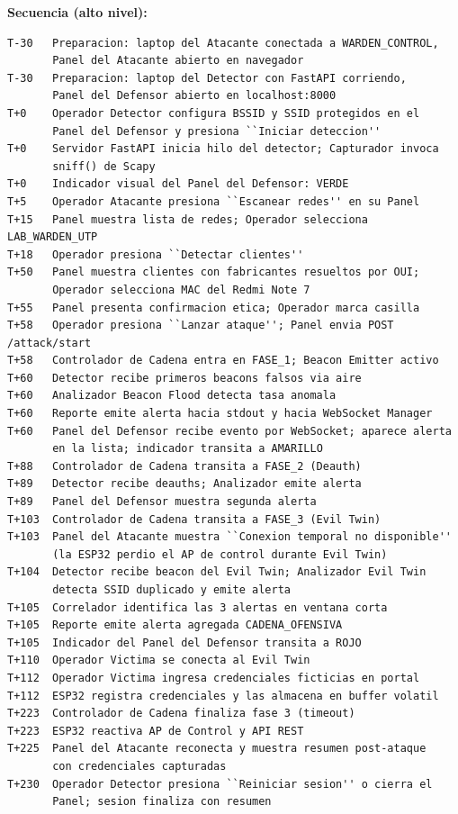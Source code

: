 \documentclass[11pt,a4paper]{article}
\begin{document}
\textbf{Secuencia (alto nivel):}

\vspace{0.3cm}
\begin{verbatim}
T-30   Preparacion: laptop del Atacante conectada a WARDEN_CONTROL,
       Panel del Atacante abierto en navegador
T-30   Preparacion: laptop del Detector con FastAPI corriendo,
       Panel del Defensor abierto en localhost:8000
T+0    Operador Detector configura BSSID y SSID protegidos en el
       Panel del Defensor y presiona ``Iniciar deteccion''
T+0    Servidor FastAPI inicia hilo del detector; Capturador invoca
       sniff() de Scapy
T+0    Indicador visual del Panel del Defensor: VERDE
T+5    Operador Atacante presiona ``Escanear redes'' en su Panel
T+15   Panel muestra lista de redes; Operador selecciona LAB_WARDEN_UTP
T+18   Operador presiona ``Detectar clientes''
T+50   Panel muestra clientes con fabricantes resueltos por OUI;
       Operador selecciona MAC del Redmi Note 7
T+55   Panel presenta confirmacion etica; Operador marca casilla
T+58   Operador presiona ``Lanzar ataque''; Panel envia POST /attack/start
T+58   Controlador de Cadena entra en FASE_1; Beacon Emitter activo
T+60   Detector recibe primeros beacons falsos via aire
T+60   Analizador Beacon Flood detecta tasa anomala
T+60   Reporte emite alerta hacia stdout y hacia WebSocket Manager
T+60   Panel del Defensor recibe evento por WebSocket; aparece alerta
       en la lista; indicador transita a AMARILLO
T+88   Controlador de Cadena transita a FASE_2 (Deauth)
T+89   Detector recibe deauths; Analizador emite alerta
T+89   Panel del Defensor muestra segunda alerta
T+103  Controlador de Cadena transita a FASE_3 (Evil Twin)
T+103  Panel del Atacante muestra ``Conexion temporal no disponible''
       (la ESP32 perdio el AP de control durante Evil Twin)
T+104  Detector recibe beacon del Evil Twin; Analizador Evil Twin
       detecta SSID duplicado y emite alerta
T+105  Correlador identifica las 3 alertas en ventana corta
T+105  Reporte emite alerta agregada CADENA_OFENSIVA
T+105  Indicador del Panel del Defensor transita a ROJO
T+110  Operador Victima se conecta al Evil Twin
T+112  Operador Victima ingresa credenciales ficticias en portal
T+112  ESP32 registra credenciales y las almacena en buffer volatil
T+223  Controlador de Cadena finaliza fase 3 (timeout)
T+223  ESP32 reactiva AP de Control y API REST
T+225  Panel del Atacante reconecta y muestra resumen post-ataque
       con credenciales capturadas
T+230  Operador Detector presiona ``Reiniciar sesion'' o cierra el
       Panel; sesion finaliza con resumen
\end{verbatim}
\end{document}
